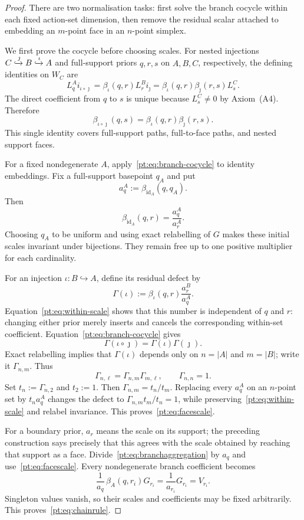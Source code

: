 \documentclass[11pt,a4paper]{article}
\theoremstyle{definition}
\newcommand{\1}{\mathbf 1}
\begin{document}
\begin{proof}
There are two normalisation tasks: first solve the branch cocycle within each
fixed action-set dimension, then remove the residual scalar attached to
embedding an $m$-point face in an $n$-point simplex.

We first prove the cocycle before choosing scales.  For nested injections
$C\xhookrightarrow{\jmath}B\xhookrightarrow{\iota}A$ and full-support
priors $q,r,s$ on $A,B,C$, respectively, the defining identities on $W_C$
are
\[
 L_q^A i_{\iota\circ\jmath}
 =\beta_\iota(q,r)L_r^B i_\jmath
 =\beta_\iota(q,r)\beta_\jmath(r,s)L_s^C.
\]
The direct coefficient from $q$ to $s$ is unique because $L_s^C\ne0$ by
Axiom~\textup{(A4)}.  Therefore
\begin{equation}
 \beta_{\iota\circ\jmath}(q,s)
 =\beta_\iota(q,r)\beta_\jmath(r,s).
\label{pt:eq:branch-cocycle}
\end{equation}
This single identity covers full-support paths, full-to-face paths, and
nested support faces.

For a fixed nondegenerate $A$, apply~\eqref{pt:eq:branch-cocycle} to identity
embeddings.  Fix a full-support basepoint $q_A$ and put
\[
 a_q^A:=\beta_{\mathrm{id}_A}(q,q_A).
\]
Then
\[
 \beta_{\mathrm{id}_A}(q,r)=\frac{a_q^A}{a_r^A}.
\tag{WS}\label{pt:eq:within-scale}
\]
Choosing $q_A$ to be uniform and using exact relabelling of $G$ makes these
initial scales invariant under bijections.  They remain free up to one
positive multiplier for each cardinality.

For an injection $\iota:B\hookrightarrow A$, define its residual defect by
\[
 \Gamma(\iota):=\beta_\iota(q,r)\frac{a_r^B}{a_q^A}.
\]
Equation~\eqref{pt:eq:within-scale} shows that this number is independent of
$q$ and $r$: changing either prior merely inserts and cancels the
corresponding within-set coefficient.  Equation~\eqref{pt:eq:branch-cocycle}
gives
\[
 \Gamma(\iota\circ\jmath)=\Gamma(\iota)\Gamma(\jmath).
\]
Exact relabelling implies that $\Gamma(\iota)$ depends only on
$n=|A|$ and $m=|B|$; write it $\Gamma_{n,m}$.  Thus
\[
 \Gamma_{n,\ell}=\Gamma_{n,m}\Gamma_{m,\ell},\qquad \Gamma_{n,n}=1.
\]
Set $t_n:=\Gamma_{n,2}$ and $t_2:=1$.  Then
$\Gamma_{n,m}=t_n/t_m$.  Replacing every $a_q^A$ on an $n$-point set by
$t_n a_q^A$ changes the defect to
$\Gamma_{n,m}t_m/t_n=1$, while preserving~\eqref{pt:eq:within-scale} and
relabel invariance.  This proves~\eqref{pt:eq:facescale}.

For a boundary prior, $a_r$ means the scale on its support; the preceding
construction says precisely that this agrees with the scale obtained by
reaching that support as a face.  Divide~\eqref{pt:eq:branchaggregation} by
$a_q$ and use~\eqref{pt:eq:facescale}.  Every nondegenerate branch coefficient
becomes
\[
 \frac1{a_q}\,\beta_A(q,r_i)G_{r_i}
 =\frac1{a_{r_i}}G_{r_i}=V_{r_i}.
\]
Singleton values vanish, so their scales and coefficients may be fixed
arbitrarily.  This proves~\eqref{pt:eq:chainrule}.
\end{proof}
\end{document}
